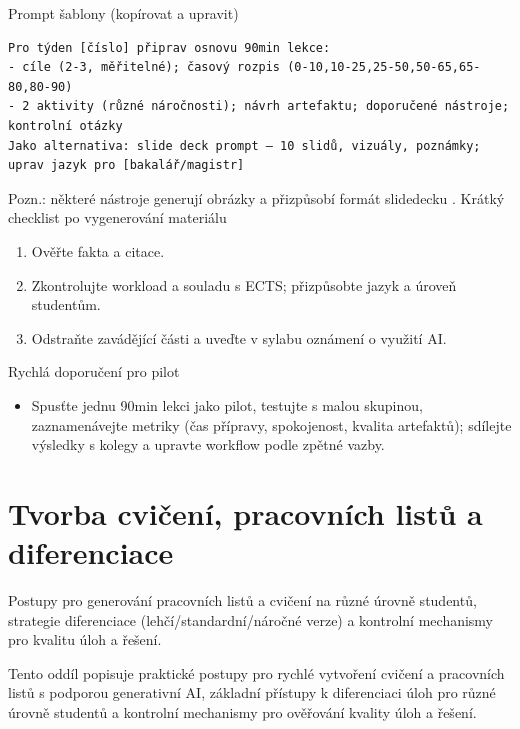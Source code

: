 \documentclass{report}%
\begin{document}
\medskip
Prompt šablony (kopírovat a upravit)
\begin{verbatim}
Pro týden [číslo] připrav osnovu 90min lekce:
- cíle (2-3, měřitelné); časový rozpis (0-10,10-25,25-50,50-65,65-80,80-90)
- 2 aktivity (různé náročnosti); návrh artefaktu; doporučené nástroje; kontrolní otázky
Jako alternativa: slide deck prompt — 10 slidů, vizuály, poznámky; uprav jazyk pro [bakalář/magistr]
\end{verbatim}
Pozn.: některé nástroje generují obrázky a přizpůsobí formát slidedecku \cite{kb_ai_101_tipu_pdf_04e4a115_page_51_1}.
\medskip
Krátký checklist po vygenerování materiálu
\begin{enumerate}
\item Ověřte fakta a citace.
\item Zkontrolujte workload a souladu s ECTS; přizpůsobte jazyk a úroveň studentům.
\item Odstraňte zavádějící části a uveďte v sylabu oznámení o využití AI.
\end{enumerate}
\medskip
Rychlá doporučení pro pilot
\begin{itemize}
\item Spusťte jednu 90min lekci jako pilot, testujte s malou skupinou, zaznamenávejte metriky (čas přípravy, spokojenost, kvalita artefaktů); sdílejte výsledky s kolegy a upravte workflow podle zpětné vazby.
\end{itemize}%

%
\section{Tvorba cvičení, pracovních listů a diferenciace}%
Postupy pro generování pracovních listů a cvičení na různé úrovně studentů, strategie diferenciace (lehčí/standardní/náročné verze) a kontrolní mechanismy pro kvalitu úloh a řešení.%


%
\medskip

Tento oddíl popisuje praktické postupy pro rychlé vytvoření cvičení a pracovních listů s podporou generativní AI, základní přístupy k diferenciaci úloh pro různé úrovně studentů a kontrolní mechanismy pro ověřování kvality úloh a řešení.
\end{document}

